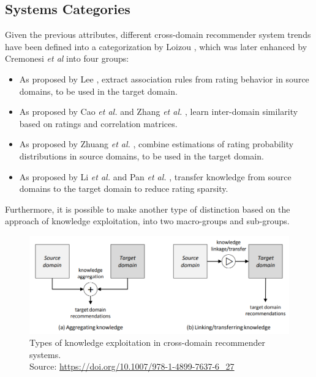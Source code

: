 \subsection{Systems Categories}

Given the previous attributes, different cross-domain recommender system trends have been defined into a categorization by Loizou \cite{crossdomain-recsys-categorization}, which was later enhanced by Cremonesi \textit{et al} \cite{crossdomain-recsys-categorization} into four groups:
\begin{itemize}
\item As proposed by Lee \cite{10.1016/S0957-41740100034-3}, extract association rules from rating behavior in source domains, to be used in the target domain.
\item As proposed by Cao \textit{et al.} \cite{10.5555/3104322.3104344} and Zhang \textit{et al.} \cite{10.5555/3023549.3023635}, learn inter-domain similarity based on ratings and correlation matrices.
\item As proposed by Zhuang \textit{et al.} \cite{10.1109/TKDE.2009.205}, combine estimations of rating probability distributions in source domains, to be used in the target domain.
\item As proposed by Li \textit{et al.} \cite{10.5555/1661445.1661773, 10.1145/1553374.1553454} and Pan \textit{et al.} \cite{10.5555/2283696.2283784, 10.5555/2898607.2898644}, transfer knowledge from source domains to the target domain to reduce rating sparsity.
\end{itemize}
Furthermore, it is possible to make another type of distinction based on the approach of knowledge exploitation, into two macro-groups and sub-groups.
\begin{figure}[hbt]
\centering
\includegraphics[width=\textwidth]{pictures/knowledge-exploitation}
\caption{Types of knowledge exploitation in cross-domain recommender systems.\\
Source: \url{https://doi.org/10.1007/978-1-4899-7637-6\_27}}
\end{figure}
